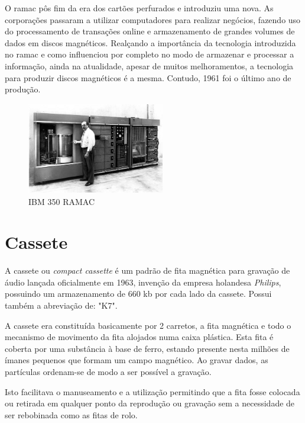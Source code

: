 \documentclass{report}
\begin{document}
		 O \ac{ramac} pôs fim da era dos cartões perfurados e introduziu uma nova. As corporações passaram a utilizar computadores para realizar negócios, fazendo uso do processamento de transações online e armazenamento de grandes volumes de dados em discos magnéticos. Realçando a importância da tecnologia introduzida no \ac{ramac} e como influenciou por completo no modo de armazenar e processar a informação, ainda na atualidade, apesar de muitos melhoramentos, a tecnologia para produzir discos magnéticos é a mesma. Contudo, 1961 foi o último ano de produção.

	\begin{figure} [h]
		\centering
		\includegraphics[width=6cm, height=4cm]	{RAMAC.jpg}
		\caption{IBM 350 RAMAC}
	\end{figure}
	
\newpage
		
		\section{Cassete}	
	A cassete ou \textit{compact cassette}  é um padrão de fita magnética para gravação de áudio lançada oficialmente em 1963, invenção da empresa holandesa \textit{Philips}, possuindo um armazenamento de 660 \ac{kb} por cada lado da cassete. Possui também a abreviação de: "K7".
\vspace{1mm}
	
	A cassete era constituída basicamente por 2 carretos, a fita magnética e todo o mecanismo de movimento da fita alojados numa caixa plástica. Esta fita é coberta por uma substância à base de ferro, estando presente nesta milhões de ímanes pequenos que formam um campo magnético. Ao gravar dados, as partículas ordenam-se de modo a ser possível a gravação.
\vspace{1mm}

	Isto facilitava o manuseamento e a utilização permitindo que a fita fosse colocada ou retirada em qualquer ponto da reprodução ou gravação sem a necessidade de ser rebobinada como as fitas de rolo. 
\vspace{1mm}
	
\end{document}
